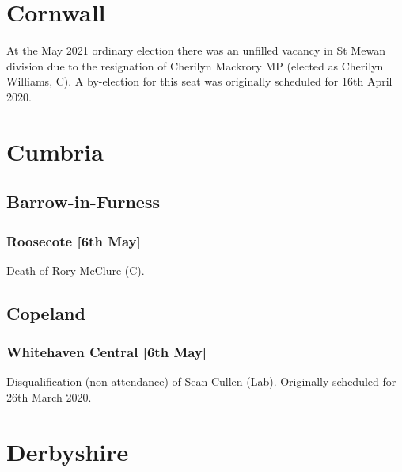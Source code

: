 \documentclass[a4paper,openany]{book}
\begin{document}
\begin{resultsiii}
\section{Cornwall}

At the May 2021 ordinary election there was an unfilled vacancy in St Mewan division due to the resignation of Cherilyn Mackrory MP (elected as Cherilyn Williams, C).  A by-election for this seat was originally scheduled for 16th April 2020.

\section{Cumbria}

\subsection*{Barrow-in-Furness}

\subsubsection*{Roosecote \hspace*{\fill}\nolinebreak[1]%
	\enspace\hspace*{\fill}
	[6th May]}


Death of Rory McClure (C).

\subsection*{Copeland}

\subsubsection*{Whitehaven Central \hspace*{\fill}\nolinebreak[1]%
	\enspace\hspace*{\fill}
	[6th May]}


Disqualification (non-attendance) of Sean Cullen (Lab).  Originally scheduled for 26th March 2020.

\section{Derbyshire}


\end{resultsiii}
\end{document}
